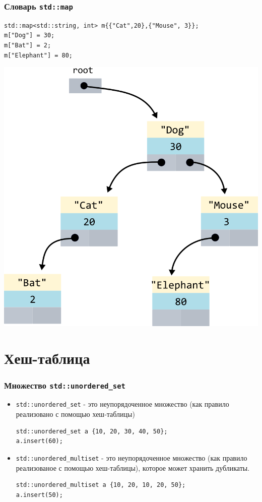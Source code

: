 \documentclass[10pt,pdf,hyperref={unicode}]{beamer}
\begin{document}
\begin{frame}[fragile]
\frametitle{Словарь \texttt{std::map}}
\begin{lstlisting}
std::map<std::string, int> m{{"Cat",20},{"Mouse", 3}};
m["Dog"] = 30;
m["Bat"] = 2;
m["Elephant"] = 80;
\end{lstlisting}
\begin{center}
\includegraphics[scale=0.7]{images/tree/bst_dict.png}
\end{center}
\end{frame}


\section{Хеш-таблица}
\begin{frame}[fragile]
\frametitle{Множество \texttt{std::unordered\_set}}
\begin{itemize}
\item \texttt{std::unordered\_set} - это неупорядоченное множество (как правило реализовано с помощью хеш-таблицы)
\begin{lstlisting}
std::unordered_set a {10, 20, 30, 40, 50};
a.insert(60);
\end{lstlisting}

\item \texttt{std::unordered\_multiset} - это неупорядоченное множество  (как правило реализованое с помощью хеш-таблицы), которое может хранить дубликаты.
\begin{lstlisting}
std::unordered_multiset a {10, 20, 10, 20, 50};
a.insert(50);
\end{lstlisting}
\end{itemize}
\end{frame}
\end{document}

